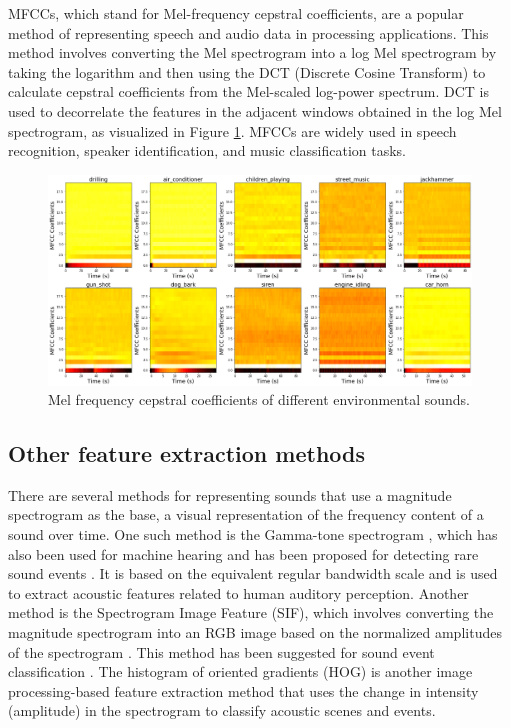 MFCCs, which stand for Mel-frequency cepstral coefficients, are a popular method of representing speech and audio data in processing applications. This method involves converting the Mel spectrogram into a log Mel spectrogram by taking the logarithm and then using the DCT (Discrete Cosine Transform) to calculate cepstral coefficients from the Mel-scaled log-power spectrum. DCT is used to decorrelate the features in the adjacent windows obtained in the log Mel spectrogram, as visualized in Figure \ref{fig:MFCCS}.  MFCCs are widely used in speech recognition, speaker identification, and music classification tasks.

\begin{figure}[htbp]
   \begin{center}
      \includegraphics[width=1\linewidth]{Chapitre1/figures/MFCCSs.png}
   \end{center}
   \caption { Mel frequency cepstral coefficients of different environmental sounds.}
   \label{fig:MFCCS}
\end{figure}




\subsection{Other feature extraction methods} 
There are several methods for representing sounds that use a magnitude spectrogram as the base, a visual representation of the frequency content of a sound over time. One such method is the Gamma-tone spectrogram \cite{patterson1992complex, slaney1993efficient}, which has also been used for machine hearing and has been proposed for detecting rare sound events \cite{plinge2014bag, yang2018sound, phan2017dnn}. It is based on the equivalent regular bandwidth scale and is used to extract acoustic features related to human auditory perception. Another method is the Spectrogram Image Feature (SIF), which involves converting the magnitude spectrogram into an RGB image based on the normalized amplitudes of the spectrogram \cite{5672395}.  This method has been suggested for sound event classification \cite{6338274}. The histogram of oriented gradients (HOG) is another image processing-based feature extraction method that uses the change in intensity (amplitude) in the spectrogram to classify acoustic scenes and events\cite{lim2015robust}. 

